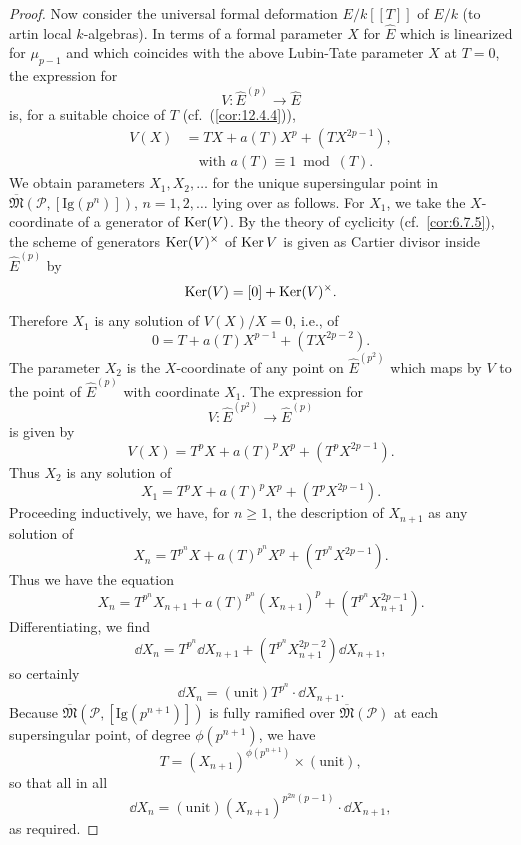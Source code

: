 \begin{proof}
Now consider the universal formal deformation $E/k[[T]]$ of $E/k$ (to artin local $k$-algebras). In terms of a formal parameter $X$ for $\widehat{E}$ which is linearized for $\mu_{p-1}$ and which coincides with the above Lubin-Tate parameter $X$ at $T = 0$, the expression for
\[
V : \widehat{E}^{(p)} \to \widehat{E}
\]
is, for a suitable choice of $T$ (cf.~(\ref{cor:12.4.4})),
\begin{align*}
V(X) &= TX + a(T)X^p + (TX^{2p-1}) , \\
&\quad\text{with } a(T) \equiv 1 \bmod (T) .
\end{align*}
We obtain parameters $X_1, X_2, \ldots$ for the unique supersingular point in $\overline{\mathfrak{M}}(\mathcal{P}, [\mathrm{Ig}(p^n)])$, $n = 1, 2, \ldots$ lying over as follows. For $X_1$, we take the $X$-coordinate of a generator of $\operatorname{Ker}(V)$. By the theory of cyclicity (cf.~\ref{cor:6.7.5}), the scheme of generators $\operatorname{Ker}(V)^\times$ of $\operatorname{Ker} V$ is given as Cartier divisor inside $\widehat{E}^{(p)}$ by
\[
\operatorname{Ker}(V) = [0] + \operatorname{Ker}(V)^\times .
\]
Therefore $X_1$ is any solution of $V(X)/X = 0$, i.e., of
\[
0 = T + a(T)X^{p-1} + (TX^{2p-2}) .
\]
The parameter $X_2$ is the $X$-coordinate of any point on $\widehat{E}^{(p^2)}$ which maps by $V$ to the point of $\widehat{E}^{(p)}$ with coordinate $X_1$. The expression for
\[
V : \widehat{E}^{(p^2)} \to \widehat{E}^{(p)}
\]
is given by
\[
V(X) = T^p X + a(T)^p X^p + (T^p X^{2p-1}) .
\]
Thus $X_2$ is any solution of
\[
X_1 = T^p X + a(T)^p X^p + (T^p X^{2p-1}) .
\]
Proceeding inductively, we have, for $n \ge 1$, the description of $X_{n+1}$ as any solution of
\[
X_n = T^{p^n} X + a(T)^{p^n} X^p + (T^{p^n} X^{2p-1}) .
\]
Thus we have the equation
\[
X_n = T^{p^n} X_{n+1} + a(T)^{p^n}(X_{n+1})^p + (T^{p^n} X_{n+1}^{2p-1}) .
\]
Differentiating, we find
\[
\dd X_n = T^{p^n} \dd X_{n+1} + (T^{p^n} X_{n+1}^{2p-2}) \dd X_{n+1} ,
\]
so certainly
\[
\dd X_n = (\mathrm{unit}) T^{p^n} \cdot \dd X_{n+1} .
\]
Because $\overline{\mathfrak{M}}(\mathcal{P}, [\mathrm{Ig}(p^{n+1})])$ is fully ramified over $\overline{\mathfrak{M}}(\mathcal{P})$ at each supersingular point, of degree $\phi(p^{n+1})$, we have
\[
T = (X_{n+1})^{\phi(p^{n+1})} \times (\mathrm{unit}) ,
\]
so that all in all
\[
\dd X_n = (\mathrm{unit}) (X_{n+1})^{p^{2n}(p-1)} \cdot \dd X_{n+1} ,
\]
as required.
\end{proof}

